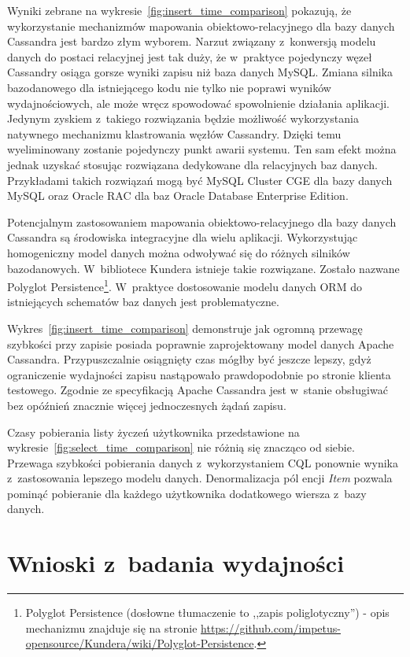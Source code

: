 Wyniki zebrane na wykresie~\ref{fig:insert_time_comparison} pokazują, że wykorzystanie mechanizmów mapowania obiektowo-relacyjnego dla bazy danych Cassandra jest bardzo złym wyborem. Narzut związany z~konwersją modelu danych do postaci relacyjnej jest tak duży, że w~praktyce pojedynczy węzeł Cassandry osiąga gorsze wyniki zapisu niż baza danych MySQL. Zmiana silnika bazodanowego dla istniejącego kodu nie tylko nie poprawi wyników wydajnościowych, ale może wręcz spowodować spowolnienie działania aplikacji. Jedynym zyskiem z~takiego rozwiązania będzie możliwość wykorzystania natywnego mechanizmu klastrowania węzłów Cassandry. Dzięki temu wyeliminowany zostanie pojedynczy punkt awarii systemu. Ten sam efekt można jednak uzyskać stosując rozwiązana dedykowane dla relacyjnych baz danych. Przykładami takich rozwiązań mogą być MySQL Cluster CGE dla bazy danych MySQL oraz Oracle RAC dla baz Oracle Database Enterprise Edition.

Potencjalnym zastosowaniem mapowania obiektowo-relacyjnego dla bazy danych Cassandra są środowiska integracyjne dla wielu aplikacji. Wykorzystując homogeniczny model danych można odwoływać się do różnych silników bazodanowych. W~bibliotece Kundera istnieje takie rozwiązane. Zostało nazwane Polyglot Persistence\footnote{Polyglot Persistence (dosłowne tłumaczenie to ,,zapis poliglotyczny'') - opis mechanizmu znajduje się na stronie \url{https://github.com/impetus-opensource/Kundera/wiki/Polyglot-Persistence}.}. W~praktyce dostosowanie modelu danych ORM do istniejących schematów baz danych jest problematyczne.  

Wykres~\ref{fig:insert_time_comparison} demonstruje jak ogromną przewagę szybkości przy zapisie posiada poprawnie zaprojektowany model danych Apache Cassandra. Przypuszczalnie osiągnięty czas mógłby być jeszcze lepszy, gdyż ograniczenie wydajności zapisu nastąpowało prawdopodobnie po stronie klienta testowego. Zgodnie ze specyfikacją Apache Cassandra jest w~stanie obsługiwać bez opóźnień znacznie więcej jednoczesnych żądań zapisu.

Czasy pobierania listy życzeń użytkownika przedstawione na wykresie~\ref{fig:select_time_comparison} nie różnią się znacząco od siebie. Przewaga szybkości pobierania danych z~wykorzystaniem CQL ponownie wynika z~zastosowania lepszego modelu danych. Denormalizacja pól encji \emph{Item} pozwala pominąć pobieranie dla każdego użytkownika dodatkowego wiersza z~bazy danych. 

\section{Wnioski z~badania wydajności}
\label{sec:cassandra_orm_performance_summary}

